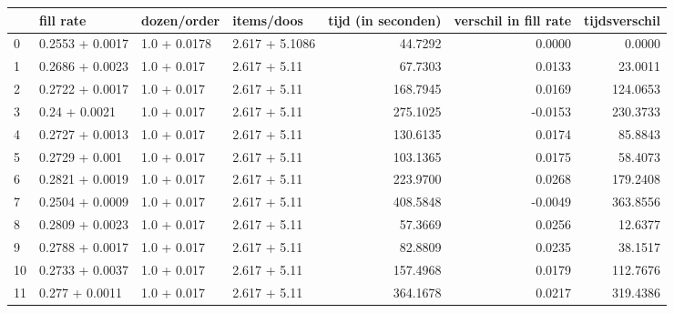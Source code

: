 \begin{tabular}{llllrrr}
\toprule
{} &        fill rate &   dozen/order &      items/doos &  tijd (in seconden) &  verschil in fill rate &  tijdsverschil \\
\midrule
0  &  0.2553 + 0.0017 &  1.0 + 0.0178 &  2.617 + 5.1086 &             44.7292 &                 0.0000 &         0.0000 \\
1  &  0.2686 + 0.0023 &   1.0 + 0.017 &    2.617 + 5.11 &             67.7303 &                 0.0133 &        23.0011 \\
2  &  0.2722 + 0.0017 &   1.0 + 0.017 &    2.617 + 5.11 &            168.7945 &                 0.0169 &       124.0653 \\
3  &    0.24 + 0.0021 &   1.0 + 0.017 &    2.617 + 5.11 &            275.1025 &                -0.0153 &       230.3733 \\
4  &  0.2727 + 0.0013 &   1.0 + 0.017 &    2.617 + 5.11 &            130.6135 &                 0.0174 &        85.8843 \\
5  &   0.2729 + 0.001 &   1.0 + 0.017 &    2.617 + 5.11 &            103.1365 &                 0.0175 &        58.4073 \\
6  &  0.2821 + 0.0019 &   1.0 + 0.017 &    2.617 + 5.11 &            223.9700 &                 0.0268 &       179.2408 \\
7  &  0.2504 + 0.0009 &   1.0 + 0.017 &    2.617 + 5.11 &            408.5848 &                -0.0049 &       363.8556 \\
8  &  0.2809 + 0.0023 &   1.0 + 0.017 &    2.617 + 5.11 &             57.3669 &                 0.0256 &        12.6377 \\
9  &  0.2788 + 0.0017 &   1.0 + 0.017 &    2.617 + 5.11 &             82.8809 &                 0.0235 &        38.1517 \\
10 &  0.2733 + 0.0037 &   1.0 + 0.017 &    2.617 + 5.11 &            157.4968 &                 0.0179 &       112.7676 \\
11 &   0.277 + 0.0011 &   1.0 + 0.017 &    2.617 + 5.11 &            364.1678 &                 0.0217 &       319.4386 \\
\bottomrule
\end{tabular}
